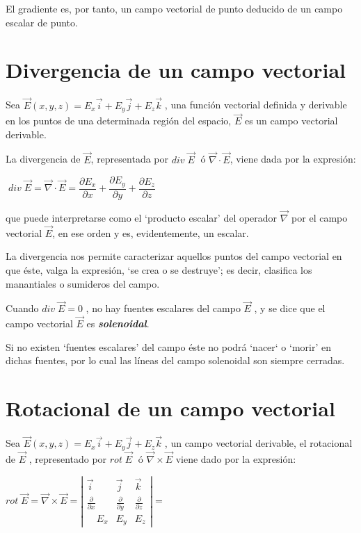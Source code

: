  El gradiente es, por tanto, un campo vectorial de punto deducido de un campo escalar de punto.
 
 \section{Divergencia de un campo vectorial}
 
 Sea $\vec E (x,y,z)=E_x \vec i + E_y \vec j + E_z \vec k\;$, una función vectorial definida y derivable en los puntos de una determinada región del espacio, $\vec E$ es un campo vectorial derivable.
 
 La divergencia de $\vec E$, representada por $div\; \vec E\;$ ó $\overrightarrow{\nabla}\cdot \vec E$, viene dada por la expresión:
 
 \vspace{4mm}\centerline{$\boxed{\; div\; \vec E = \overrightarrow{\nabla}\cdot \vec E = \dfrac {\partial E_x}{\partial x } + \dfrac {\partial E_y}{\partial y }+ \dfrac {\partial E_z}{\partial z } \; }$} 
 
 \vspace{3mm} que puede interpretarse como el `producto escalar' del operador $\overrightarrow{\nabla}$ por el campo vectorial $\vec E$, en ese orden y es, evidentemente, un escalar.
 
	La divergencia nos permite caracterizar aquellos puntos del campo vectorial en que éste, valga la expresión, `se crea o se destruye'; es decir, clasifica los manantiales o sumideros del campo. 

	Cuando $div \; \vec E = 0$ , no hay fuentes escalares del campo $\vec E$ , y se dice que el campo vectorial $\vec E$ es \textbf{\emph{solenoidal}}. 

	Si no existen `fuentes escalares' del campo éste no podrá `nacer` o `morir' en dichas fuentes, por lo cual las líneas del campo solenoidal son siempre cerradas. 

\section{Rotacional de un campo vectorial}

Sea $\vec E (x,y,z)=E_x \vec i + E_y \vec j + E_z \vec k\;$, un campo vectorial derivable, el rotacional de $\vec E$ , representado por $rot \; \vec E\; $ ó $\overrightarrow{\nabla} \times \vec E$ viene dado por la expresión:

\vspace{4mm} $rot \; \vec E = \overrightarrow{\nabla} \times \overrightarrow {E} = \left| \begin{matrix} \vec { i }  & \vec { j }  & \vec { k }  \\ \frac { \partial  }{ \partial x }  & \frac { \partial  }{ \partial y }  & \frac { \partial  }{ \partial z }  \\ \quad E_{ x } & E_{ y } & E_{ z } \end{matrix} \right| =$

